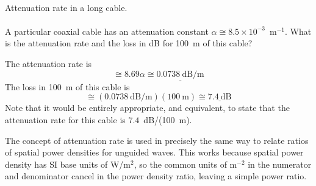 ~\\ \begin{example} 
\begin{mdframed}[backgroundcolor=brown!20,linecolor=brown!20]\raggedright
Attenuation rate in a long cable.
\\~\\
A particular coaxial cable has an attenuation constant $\alpha\cong 8.5\times 10^{-3}$~m$^{-1}$.
What is the attenuation rate and the loss in dB for 100~m of this cable?

The attenuation rate is
$$ \cong 8.69\alpha \cong \underline{0.0738~\mbox{dB/m}} $$
The loss in 100~m of this cable is
$$ \cong \left(0.0738~\mbox{dB/m}\right)\left(100~\mbox{m}\right) \cong \underline{7.4~\mbox{dB}} $$
Note that it would be entirely appropriate, and equivalent, to state that the attenuation rate for this cable is $7.4$~dB/(100~m).

\end{mdframed}
\end{example}

The concept of attenuation rate is used in precisely the same way to relate ratios of spatial power densities for unguided waves.  
This works because spatial power density has SI base units of W/m$^2$, so the common units of m$^{-2}$ in the numerator and denominator cancel in the power density ratio, leaving a simple power ratio.





